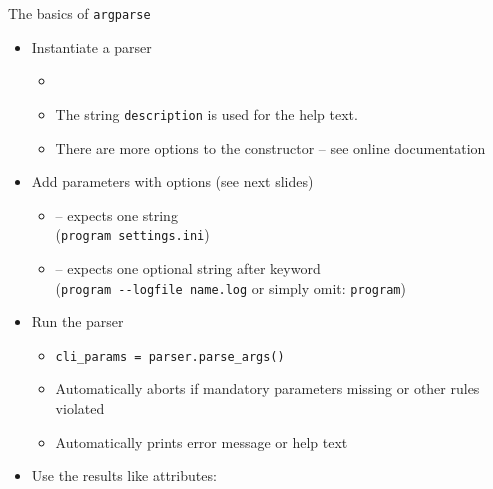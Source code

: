 \begin{frame}[fragile]{The basics of \texttt{argparse}}
%
\begin{itemize}
\item Instantiate a parser
	\begin{itemize}
	\item {}
	\item The string \texttt{description} is used for the help text.
	\item There are more options to the constructor -- see online documentation
	\end{itemize}
\item Add parameters with options (see next slides)
	\begin{itemize}
	\item {} -- expects one string \\
		(\zB \texttt{program settings.ini})
	\item {}  -- expects one optional string after keyword \\
		(\zB \texttt{program -{}-logfile name.log} or simply omit: \texttt{program})
	\end{itemize}
\item Run the parser
	\begin{itemize}
	\item \texttt{cli\_params = parser.parse\_args()}
	\item Automatically aborts if mandatory parameters missing or other rules violated
	\item Automatically prints error message or help text
	\end{itemize}
\item Use the results like attributes: 
\end{itemize}
%
\end{frame}


